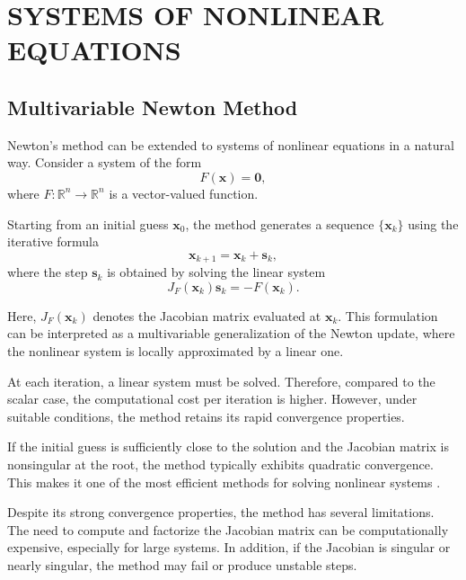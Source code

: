 \chapter{\MakeUppercase{Systems of Nonlinear Equations}}

\section{Multivariable Newton Method}

Newton's method can be extended to systems of nonlinear equations in a natural way. Consider a system of the form
\begin{equation}
F(\mathbf{x}) = \mathbf{0},
\end{equation}
where \( F : \mathbb{R}^n \to \mathbb{R}^n \) is a vector-valued function.

Starting from an initial guess \( \mathbf{x}_0 \), the method generates a sequence \( \{\mathbf{x}_k\} \) using the iterative formula
\begin{equation}
\mathbf{x}_{k+1} = \mathbf{x}_k + \mathbf{s}_k,
\end{equation}
where the step \( \mathbf{s}_k \) is obtained by solving the linear system
\begin{equation}
J_F(\mathbf{x}_k)\mathbf{s}_k = -F(\mathbf{x}_k).
\end{equation}

Here, \( J_F(\mathbf{x}_k) \) denotes the Jacobian matrix evaluated at \( \mathbf{x}_k \). This formulation can be interpreted as a multivariable generalization of the Newton update, where the nonlinear system is locally approximated by a linear one.

At each iteration, a linear system must be solved. Therefore, compared to the scalar case, the computational cost per iteration is higher. However, under suitable conditions, the method retains its rapid convergence properties.

If the initial guess is sufficiently close to the solution and the Jacobian matrix is nonsingular at the root, the method typically exhibits quadratic convergence. This makes it one of the most efficient methods for solving nonlinear systems \cite{kelley, burden}.

Despite its strong convergence properties, the method has several limitations. The need to compute and factorize the Jacobian matrix can be computationally expensive, especially for large systems. In addition, if the Jacobian is singular or nearly singular, the method may fail or produce unstable steps.

